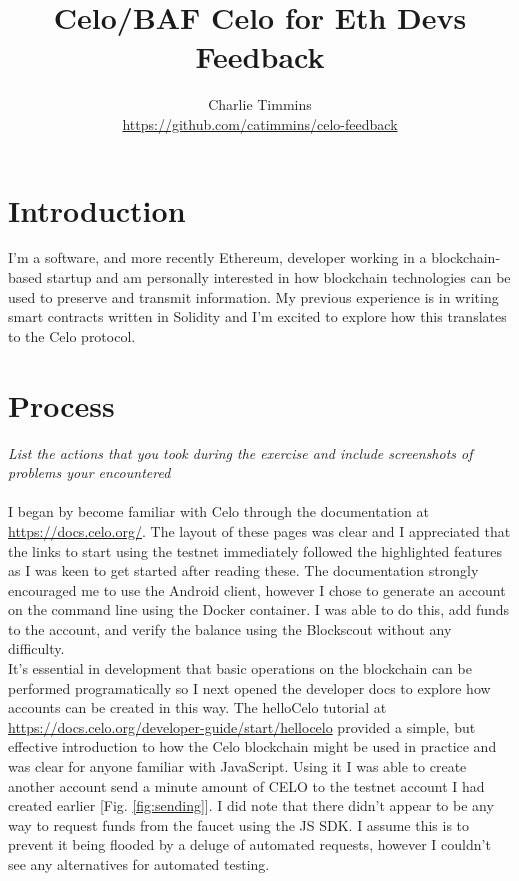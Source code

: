 \documentclass[a4paper,11pt]{article}
\title{Celo/BAF Celo for Eth Devs Feedback}
\author{Charlie Timmins\\
  \url{https://github.com/catimmins/celo-feedback}}
\date{\begin{flushright}Jan. 2020\end{flushright}}
\begin{document}
\maketitle

\section*{Introduction}
I'm a software, and more recently Ethereum, developer working in a
blockchain-based startup and am personally interested in how blockchain
technologies can be used to preserve and transmit information. My previous
experience is in writing smart contracts written in Solidity and I'm excited to
explore how this translates to the Celo protocol.

\section*{Process}
\emph{List the actions that you took during the exercise and include screenshots
  of problems your encountered}
\\\\
I began by become familiar with Celo through the documentation at
\url{https://docs.celo.org/}.  The layout of these pages was clear and I
appreciated that the links to start using the testnet immediately followed the
highlighted features as I was keen to get started after reading these.  The
documentation strongly encouraged me to use the Android client, however I chose
to generate an account on the command line using the Docker container.  I was
able to do this, add funds to the account, and verify the balance using the
Blockscout without any difficulty.\\


It's essential in development that basic operations on the blockchain can be
performed programatically so I next opened the developer docs to explore how
accounts can be created in this way.  The helloCelo tutorial at
\url{https://docs.celo.org/developer-guide/start/hellocelo} provided a simple,
but effective introduction to how the Celo blockchain might be used in practice
and was clear for anyone familiar with JavaScript.  Using it I was able to
create another account send a minute amount of CELO to the testnet account I had
created earlier [Fig. \ref{fig:sending}].  I did note that there didn't appear
to be any way to request funds from the faucet using the JS SDK.  I assume this
is to prevent it being flooded by a deluge of automated requests, however I
couldn't see any alternatives for automated testing.\\
\end{document}
